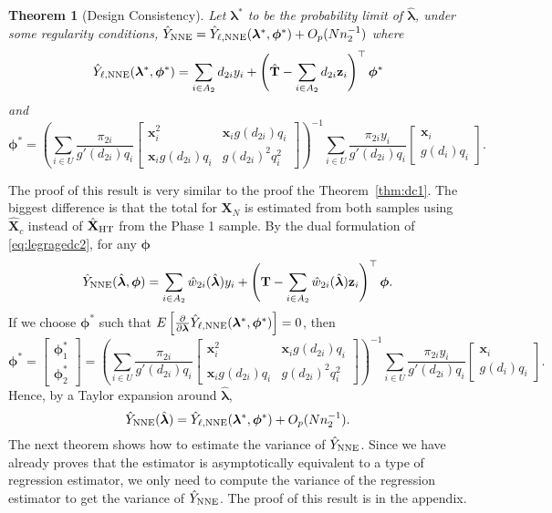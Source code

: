 \documentclass[12pt]{article}
\newtheorem{theorem}{Theorem}
\renewcommand{\bf}[1]{\mathbf{#1}}
\begin{document}
\begin{theorem}[Design Consistency]\label{thm:dc2}
  Let $\bm \lambda^*$ to be the probability limit of $\hat{\bm \lambda}$,
  under some regularity conditions,
  $\hat Y_{\rm NNE} = \hat Y_{\ell, \rm NNE}(\bm \lambda^*,
  \bm \phi^*) + O_p(Nn_2^{-1})$ where
  $$
  \hat Y_{\ell, \rm NNE}(\bm \lambda^*, \bm \phi^*) = 
  \sum_{i \in A_2} d_{2i} y_i + 
  \left(\hat{\bf T} - \sum_{i \in A_2} d_{2i} \bf z_i \right)^\top \bm \phi^*
  $$
  and 
  $$
  \bm \phi^* =
  \left(\sum_{i \in U} \frac{\pi_{2i}}{g'(d_{2i})q_i} 
  \begin{bmatrix}
    \bf x_i^2 & \bf x_i g(d_{2i}) q_i\\
    \bf x_i g(d_{2i}) q_i & g(d_{2i})^2 q_i^2
  \end{bmatrix}
  \right)^{-1}
  \sum_{i \in U} \frac{\pi_{2i} y_i}{g'(d_{2i})q_i} 
  \begin{bmatrix} \bf x_i \\ g(d_i) q_i \end{bmatrix}.
  $$
\end{theorem}

The proof of this result is very similar to the proof the
Theorem~\ref{thm:dc1}. The biggest difference is that the total for $\bf X_N$ is
estimated from both samples using $\hat{\bf X}_c$ instead of 
$\hat{\bf X}_{\rm HT}$ from the Phase 1 sample. 
By the dual formulation of \eqref{eq:legragedc2}, for any $\bm \phi$
$$\hat Y_{\rm NNE} (\hat{\bm \lambda}, \bm \phi) = \sum_{i \in A_2} \hat
w_{2i}(\hat{\bm \lambda})y_i + \left(\bf T - \sum_{i \in A_2} \hat
w_{2i}(\hat{\bm \lambda}) \bf z_i \right)^\top \bm \phi.$$
If we choose $\bm \phi^*$ such that $E\left[\frac{\partial}{\partial \bm \lambda} 
  \hat Y_{\ell, \rm NNE}(\bm \lambda^*, \bm \phi^*)\right] = 0$, then
$$\bm \phi^* =
\begin{bmatrix}
  \bm \phi^*_1 \\ \bm \phi^*_2
\end{bmatrix} = 
\left(\sum_{i \in U} \frac{\pi_{2i}}{g'(d_{2i})q_i} 
\begin{bmatrix}
  \bf x_i^2  & \bf x_i g(d_{2i}) q_i \\
  \bf x_i g(d_{2i}) q_i & g(d_{2i})^2 q_i^2
\end{bmatrix}
\right)^{-1}
\sum_{i \in U} \frac{\pi_{2i} y_i}{g'(d_{2i})q_i} 
\begin{bmatrix} \bf x_i \\ g(d_i) q_i\end{bmatrix}.
$$
Hence, by a Taylor expansion around $\hat{\bm \lambda}$,
$$\hat Y_{\rm NNE}(\hat{\bm \lambda}) = \hat Y_{\ell, \rm NNE}(\bm \lambda^*, 
\bm \phi^*) + O_p(Nn_2^{-1}).$$
The next theorem shows how to estimate the variance of $\hat Y_{\rm NNE}$.
Since we have already proves that the estimator is asymptotically equivalent to
a type of regression estimator, we only need to compute the variance of the
regression estimator to get the variance of $\hat Y_{\rm NNE}$.
The proof of this result is in the appendix.
\end{document}
